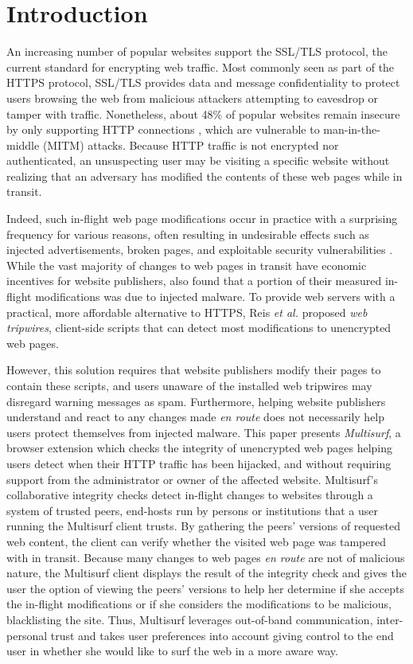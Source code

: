 \section{Introduction}
\label{sec:intro}

An increasing number of popular websites support the SSL/TLS protocol, the current standard for encrypting web traffic.
Most commonly seen as part of the HTTPS protocol, SSL/TLS provides data and message confidentiality to protect users browsing the web from malicious attackers attempting to eavesdrop or tamper with traffic. 
Nonetheless, about 48\% of popular websites remain insecure by only supporting HTTP connections \cite{sslpulse}, which are vulnerable to man-in-the-middle (MITM) attacks.
Because HTTP traffic is not encrypted nor authenticated, an unsuspecting user may be visiting a specific website without realizing that an adversary has modified the contents of these web pages while in transit.

Indeed, such in-flight web page modifications occur in practice with a surprising frequency for various reasons, often resulting in undesirable effects such as injected advertisements, broken pages, and exploitable security vulnerabilities \cite{reis2008detecting}. 
While the vast majority of changes to web pages in transit have economic incentives for website publishers, \cite{reis2008detecting} also found that a portion of their measured in-flight modifications was due to injected malware.
To provide web servers with a practical, more affordable alternative to HTTPS, Reis \emph{et al.} \cite{reis2008detecting} proposed \emph{web tripwires}, client-side scripts that can detect most modifications to unencrypted web pages.

However, this solution requires that website publishers modify their pages to contain these scripts, and users unaware of the installed web tripwires may disregard warning messages as spam.
Furthermore, helping website publishers understand and react to any changes made \emph{en route} does not necessarily help users protect themselves from injected malware.
This paper presents \emph{Multisurf}, a browser extension which checks the integrity of unencrypted web pages helping users detect when their HTTP traffic has been hijacked, and without requiring support from the administrator or owner of the affected website. 
Multisurf's collaborative integrity checks detect in-flight changes to websites through a system of trusted peers, end-hosts run by persons or institutions that a user running the Multisurf client trusts. 
By gathering the peers' versions of requested web content, the client can verify whether the visited web page was tampered with in transit.
Because many changes to web pages \emph{en route} are not of malicious nature, the Multisurf client displays the result of the integrity check and gives the user the option of viewing the peers' versions to help her determine if she accepts the in-flight modifications or if she considers the modifications to be malicious, blacklisting the site. 
Thus, Multisurf leverages out-of-band communication, inter-personal trust and takes user preferences into account giving control to the end user in whether she would like to surf the web in a more aware way.

